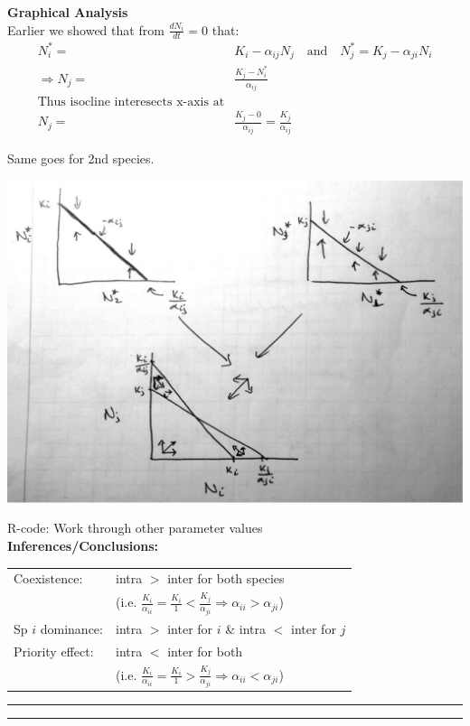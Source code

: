 \documentclass{article}
\newcommand{\note}[1]{\colorbox{gray!30}{#1}}
\newcommand{\ind}{\-\hspace{1cm}}
\begin{document}
\textbf{Graphical Analysis}\\
Earlier we showed that from $\frac{dN_i}{dt}=0$ that:
\begin{align*}
	N_i^* = & K_i - \alpha_{ij} N_j \quad \text{and}\quad N_j^* = K_j - \alpha_{ji} N_i\\
	\Rightarrow N_j = & \frac{K_j-N_i^*}{\alpha_{ij}}\\
	\text{Thus isocline interesects x-axis at}\\
  N_j = & \frac{K_j-0}{\alpha_{ij}}=\frac{K_j}{\alpha_{ij}}
	\end{align*}

Same goes for 2nd species.
\begin{center}
\includegraphics[width=17cm]{figs/LV_comp_isoclines.pdf}
\end{center}
\note{R-code: Work through other parameter values}\\

\textbf{Inferences/Conclusions:}

\begin{table}[h]
\centering
\begin{tabular}{ll}
Coexistence: & intra $>$ inter for both species  \\
& \ind \ind (i.e. $\frac{K_i}{\alpha_{ii}}=\frac{K_i}{1} < \frac{K_j}{\alpha_{ji}} \Rightarrow \alpha_{ii}>\alpha_{ji}$)\\
Sp $i$ dominance: & intra $>$ inter for $i$ \& intra $<$ inter for $j$\\
Priority effect: & intra $<$ inter for both\\
& \ind \ind (i.e. $\frac{K_i}{\alpha_{ii}}=\frac{K_i}{1} > \frac{K_j}{\alpha_{ji}} \Rightarrow \alpha_{ii}<\alpha_{ji}$)
\end{tabular} 
\end{table}

\rule[0.5ex]{\linewidth}{1pt}
\rule[0.5ex]{\linewidth}{1pt}
\end{document}

